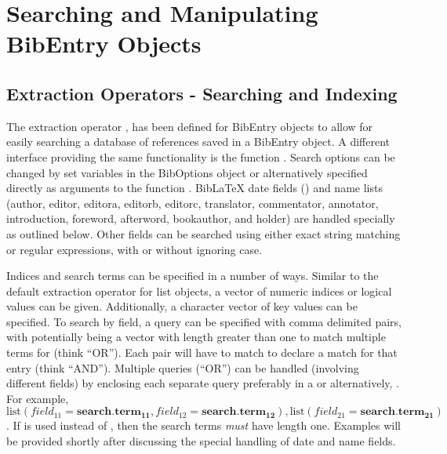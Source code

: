 \documentclass[article]{jss}\usepackage[]{graphicx}\usepackage[]{color}
\begin{document}
\section{Searching and Manipulating BibEntry Objects}\label{sec_manip}
\subsection{Extraction Operators - Searching and Indexing}\label{searchsec}
The extraction operator \code{'['}, has been defined for BibEntry objects to allow for easily searching a database of references saved in a BibEntry object.  A different interface providing the same functionality is the function .  Search options can be changed by set variables in the BibOptions object or alternatively specified directly as arguments to the function .  BibLaTeX date fields () and name lists (author, editor, editora, editorb, editorc, translator, commentator, annotator, introduction, foreword, afterword, bookauthor, and holder) are handled specially as outlined below.  Other fields can be searched using either exact string matching or regular expressions, with or without ignoring case.

Indices and search terms can be specified in a number of ways.  Similar to the default extraction operator for list objects, a vector of numeric indices or logical values can be given.  Additionally, a character vector of key values can be specified.  To search by field, a query can be specified with comma delimited  pairs, with  potentially being a vector with length greater than one to match multiple terms for  (think ``OR'').  Each  pair will have to match to declare a match for that entry (think ``AND'').  Multiple queries (``OR'') can be handled (involving different fields) by enclosing each separate query preferably in a  or alternatively, .  For example, $\text{list}(field_{11} = \mathbf{search.term_{11}},field_{12}=\mathbf{search.term_{12}}),\text{list}(field_{21}=\mathbf{search.term_{21}})$.  If  is used instead of , then the search terms \emph{must} have length one.  Examples will be provided shortly after discussing the special handling of date and name fields.  
\end{document}
